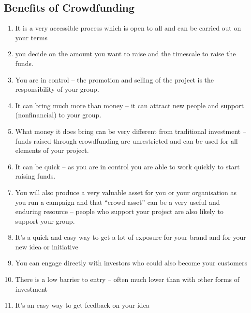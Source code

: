 \subsection*{ Benefits of Crowdfunding }
\begin{enumerate}
    \item It is a very accessible process which is open to all and can be carried out on your terms
    \item you decide on the amount you want to raise and the timescale to raise the funds.
    \item You are in control – the promotion and selling of the project is the responsibility of
          your group.
    \item It can bring much more than money – it can attract new people and support (nonfinancial) to your group.
    \item What money it does bring can be very different from traditional investment – funds
          raised through crowdfunding are unrestricted and can be used for all elements of
          your project.
    \item It can be quick – as you are in control you are able to work quickly to start raising funds.
    \item You will also produce a very valuable asset for you or your organisation as you run a
          campaign and that “crowd asset” can be a very useful and enduring resource –
          people who support your project are also likely to support your group.
    \item It’s a quick and easy way to get a lot of exposure for your brand and for your new idea or initiative
    \item You can engage directly with investors who could also become your customers
    \item There is a low barrier to entry – often much lower than with other forms of investment
    \item It’s an easy way to get feedback on your idea
\end{enumerate}


